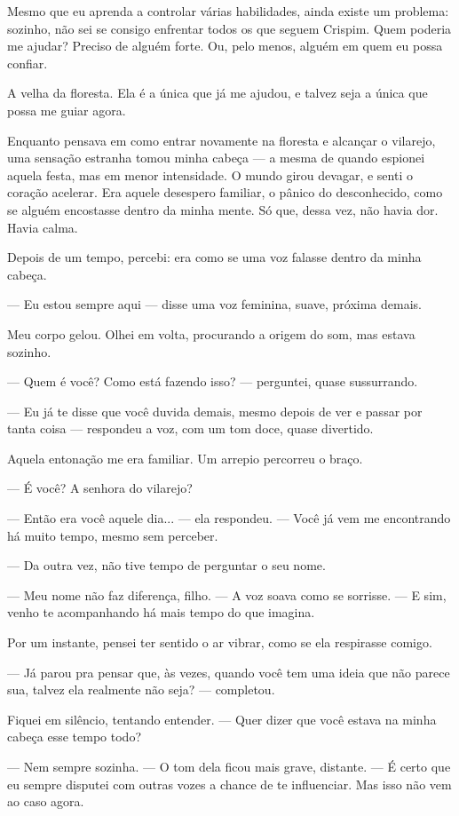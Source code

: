 Mesmo que eu aprenda a controlar várias habilidades, ainda existe um problema: sozinho, não sei se consigo enfrentar todos os que seguem Crispim.  
Quem poderia me ajudar?  
Preciso de alguém forte. Ou, pelo menos, alguém em quem eu possa confiar.

A velha da floresta.  
Ela é a única que já me ajudou, e talvez seja a única que possa me guiar agora.

Enquanto pensava em como entrar novamente na floresta e alcançar o vilarejo, uma sensação estranha tomou minha cabeça — a mesma de quando espionei aquela festa, mas em menor intensidade.  
O mundo girou devagar, e senti o coração acelerar. Era aquele desespero familiar, o pânico do desconhecido, como se alguém encostasse dentro da minha mente.  
Só que, dessa vez, não havia dor. Havia calma.

Depois de um tempo, percebi: era como se uma voz falasse dentro da minha cabeça.

— Eu estou sempre aqui — disse uma voz feminina, suave, próxima demais.

Meu corpo gelou. Olhei em volta, procurando a origem do som, mas estava sozinho.

— Quem é você? Como está fazendo isso? — perguntei, quase sussurrando.

— Eu já te disse que você duvida demais, mesmo depois de ver e passar por tanta coisa — respondeu a voz, com um tom doce, quase divertido.

Aquela entonação me era familiar. Um arrepio percorreu o braço.

— É você? A senhora do vilarejo?

— Então era você aquele dia... — ela respondeu. — Você já vem me encontrando há muito tempo, mesmo sem perceber.

— Da outra vez, não tive tempo de perguntar o seu nome.

— Meu nome não faz diferença, filho. — A voz soava como se sorrisse. — E sim, venho te acompanhando há mais tempo do que imagina.

Por um instante, pensei ter sentido o ar vibrar, como se ela respirasse comigo.

— Já parou pra pensar que, às vezes, quando você tem uma ideia que não parece sua, talvez ela realmente não seja? — completou.

Fiquei em silêncio, tentando entender.  
— Quer dizer que você estava na minha cabeça esse tempo todo?

— Nem sempre sozinha. — O tom dela ficou mais grave, distante. — É certo que eu sempre disputei com outras vozes a chance de te influenciar. Mas isso não vem ao caso agora.

